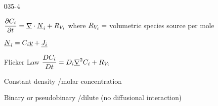 \begin{mitframe}{035-4}
\begin{listone}
	\item$\dfrac{\partial\conc_{\state}}{\partial{t}}=\gradop\cdot\uline\nummoles_{\state}+\gasconst_{\vol_{\state}}$ where $\gasconst_{\vol_{\state}}=$ volumetric species source per mole
	\item$\uline{\nummoles}_{\state}=\conc_{\state}\uline{\vvel}+\uline{\molspecflux}$
			\begin{listtwo}
            	\item Flicker Law $\dfrac{\elecdisplace\conc_{\state}}{\elecdisplace{t}}=\elecdisplace_{\state}\gradop^2\conc_{\state}+\gasconst_{\vol_{\state}}$
            			\begin{listthree}
                        	\item Constant density /molar concentration
                        	\item Binary or pseudobinary /dilute (no diffusional interaction)
						\end{listthree}
			\end{listtwo}
\end{listone}
\end{mitframe}